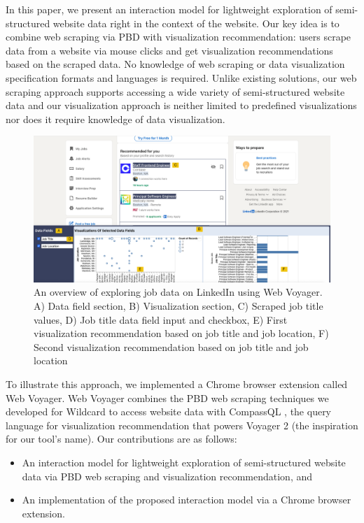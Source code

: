 \documentclass{vgtc}                          %
\begin{document}
In this paper, we present an interaction model for lightweight exploration of semi-structured website data right in the context of the website. Our key idea is to combine web scraping via PBD with visualization recommendation: users scrape data from a website via mouse clicks and get visualization recommendations based on the scraped data. No knowledge of web scraping or data visualization specification formats and languages is required. Unlike existing solutions, our web scraping approach supports accessing a wide variety of semi-structured website data and our visualization approach is neither limited to predefined visualizations nor does it require knowledge of data visualization.

\begin{figure}
  \includegraphics[width=\textwidth]{figures/example}
  \caption{\label{fig:example}An overview of exploring job data on LinkedIn using Web Voyager. A) Data field section, B) Visualization section, C) Scraped job title values, D) Job title data field input and checkbox, E) First visualization recommendation based on job title and job location, F) Second visualization recommendation based on job title and job location}
  \label{fig:example}
\end{figure}

To illustrate this approach, we implemented a Chrome browser extension called Web Voyager. Web Voyager combines the PBD web scraping techniques we developed for Wildcard \cite{litt2020} to access website data with CompassQL \cite{wongsuphasawat2016}, the query language for visualization recommendation that powers Voyager 2 \cite{wongsuphasawat2017} (the inspiration for our tool’s name). Our contributions are as follows:

\begin{itemize}
 \item An interaction model for lightweight exploration of semi-structured website data via PBD web scraping and visualization recommendation, and
 \item An implementation of the proposed interaction model via a Chrome browser extension.
\end{itemize}
\end{document}
